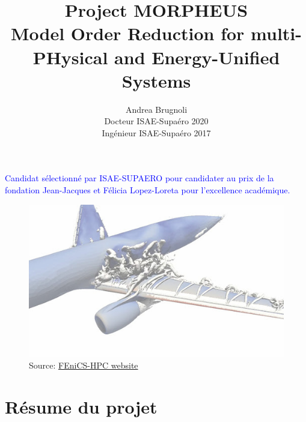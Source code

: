 \documentclass[12pt, french]{article}
\author{Andrea Brugnoli \\ 
	\hspace{2.8pt} Docteur ISAE-Supaéro 2020\\
	Ingénieur ISAE-Supaéro 2017}
\title{Project MORPHEUS \\
	\vspace{.3cm}
	\Large{Model Order Reduction for multi-PHysical and Energy-Unified Systems}  }
\date{}
\newcommand{\review}[1]{\textcolor{blue}{#1}}
\begin{document}
	
	\maketitle
	
	\large{\noindent \review{Candidat sélectionné par ISAE-SUPAERO pour candidater au prix de la fondation Jean-Jacques et Félicia Lopez-Loreta pour l'excellence académique.} }

	
	
	\begin{figure}[h]
		\centering
		\includegraphics[width=.95\textwidth]{3Dplane.jpg}
		\captionsetup{labelformat=empty}
		\caption{Source: \href{http://www.fenics-hpc.org/}{FEniCS-HPC website}}
	\end{figure}
	
	
	
	
	
	\thispagestyle{empty}
	
	\newpage
	
	\section{Résume du projet}
	
\end{document}
